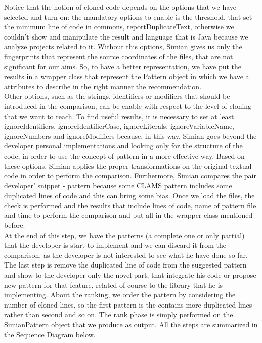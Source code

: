 Notice that the notion of cloned code depends on the options that we have selected and turn on: the mandatory options to enable is the threshold, that set the minimum line of code in commons, reportDuplicateText, otherwise we couldn't show and manipulate the result and language that is Java because we analyze projects related to it. Without this options, Simian gives us only the fingerprints that represent the source coordinates of the files, that are not significant for our aims. So, to have a better representation, we have put the results in a wrapper class that represent the Pattern object in which we have all attributes to describe in the right manner the recommendation.\\
Other options, such as the strings, identifiers or modifiers that should be introduced in the comparison, can be enable with respect to the level of cloning that we want to reach. To find useful results, it is necessary to set at least ignoreIdentifiers, ignoreIdentifierCase, ignoreLiterals, ignoreVariableName, ignoreNumbers and ignoreModifiers because, in this way, Simian goes beyond the developer personal implementations and looking only for the structure of the code, in order to use the concept of pattern in a more effective way. Based on these options, Simian applies the proper transformations on the original textual code in order to perform the comparison. 
Furthermore, Simian compares the pair developer' snippet - pattern because some CLAMS pattern includes some duplicated lines of code and this can bring some bias. Once we load the files, the check is performed and the results that include lines of code, name of pattern file and time to perform the comparison and put all in the wrapper class mentioned before.\\
At the end of this step, we have the patterns (a complete one or only partial) that the developer is start to implement and we can discard it from the comparison, as the developer is not interested to see what he have done so far. The last step is remove the duplicated line of code from the suggested pattern and show to the developer only the novel part, that integrate his code or propose new pattern for that feature, related of course to the library that he is implementing. About the ranking, we order the pattern by considering the number of cloned lines, so the first pattern is the contains more duplicated lines rather than second and so on. The rank phase is simply performed on the SimianPattern object that we produce as output. All the steps are summarized in the Sequence Diagram below.

